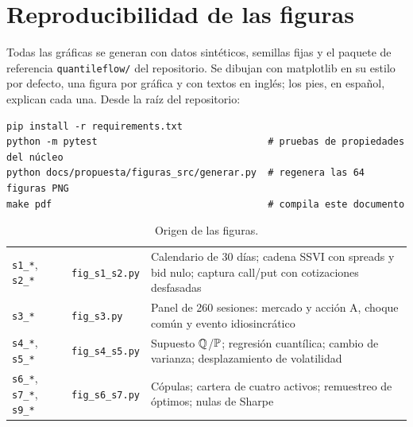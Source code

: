 \section{Reproducibilidad de las figuras}\label{ap:reproducibilidad}

Todas las gráficas se generan con datos sintéticos, semillas fijas y el paquete de referencia
\texttt{quantileflow/} del repositorio. Se dibujan con matplotlib en su estilo por defecto, una figura por
gráfica y con textos en inglés; los pies, en español, explican cada una. Desde la raíz del repositorio:

\begin{lstlisting}[style=registro]
pip install -r requirements.txt
python -m pytest                              # pruebas de propiedades del núcleo
python docs/propuesta/figuras_src/generar.py  # regenera las 64 figuras PNG
make pdf                                      # compila este documento
\end{lstlisting}

\begin{table}[H]
\centering\small
\caption{Origen de las figuras.}
\label{tab:origen}
\begin{tabularx}{\linewidth}{@{}l l Y@{}}
\toprule
{} &  & \\
\midrule
\texttt{s1\_*}, \texttt{s2\_*} & \texttt{fig\_s1\_s2.py} & Calendario de 30 días; cadena SSVI con spreads y bid nulo; captura call/put con cotizaciones desfasadas\\
\texttt{s3\_*} & \texttt{fig\_s3.py} & Panel de 260 sesiones: mercado y acción A, choque común y evento idiosincrático\\
\texttt{s4\_*}, \texttt{s5\_*} & \texttt{fig\_s4\_s5.py} & Supuesto $\Q$/$\P$; regresión cuantílica; cambio de varianza; desplazamiento de volatilidad\\
\texttt{s6\_*}, \texttt{s7\_*}, \texttt{s9\_*} & \texttt{fig\_s6\_s7.py} & Cópulas; cartera de cuatro activos; remuestreo de óptimos; nulas de Sharpe\\
\bottomrule
\end{tabularx}
\end{table}

